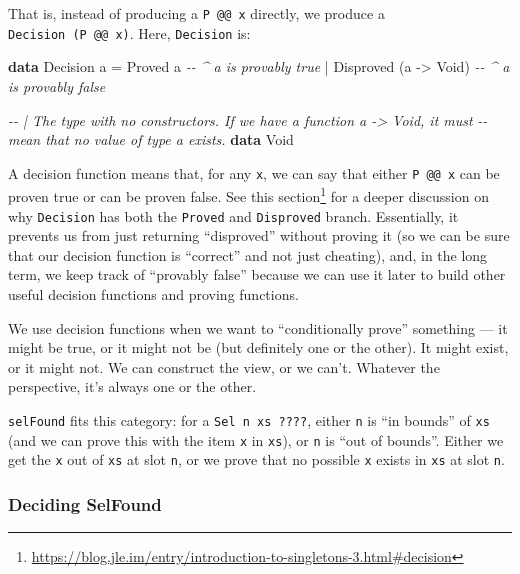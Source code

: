 \documentclass[]{article}
\newenvironment{Shaded}{}{}
\newcommand{\CommentTok}[1]{\textcolor[rgb]{0.38,0.63,0.69}{\textit{#1}}}
\newcommand{\DataTypeTok}[1]{\textcolor[rgb]{0.56,0.13,0.00}{#1}}
\newcommand{\KeywordTok}[1]{\textcolor[rgb]{0.00,0.44,0.13}{\textbf{#1}}}
\newcommand{\NormalTok}[1]{#1}
\newcommand{\OperatorTok}[1]{\textcolor[rgb]{0.40,0.40,0.40}{#1}}
\newcommand{\OtherTok}[1]{\textcolor[rgb]{0.00,0.44,0.13}{#1}}
\renewcommand{\href}[2]{#2\footnote{\url{#1}}}
\begin{document}
That is, instead of producing a \texttt{P\ @@\ x} directly, we produce a
\texttt{Decision\ (P\ @@\ x)}. Here, \texttt{Decision} is:

\begin{Shaded}
\begin{Highlighting}[]
\KeywordTok{data} \DataTypeTok{Decision}\NormalTok{ a}
    \OtherTok{=} \DataTypeTok{Proved}\NormalTok{     a                }\CommentTok{{-}{-} \^{} \textasciigrave{}a\textasciigrave{} is provably true}
    \OperatorTok{|} \DataTypeTok{Disproved}\NormalTok{ (a }\OtherTok{{-}\textgreater{}} \DataTypeTok{Void}\NormalTok{)       }\CommentTok{{-}{-} \^{} \textasciigrave{}a\textasciigrave{} is provably false}

\CommentTok{{-}{-} | The type with no constructors.  If we have a function \textasciigrave{}a {-}\textgreater{} Void\textasciigrave{}, it must}
\CommentTok{{-}{-} mean that no value of type \textasciigrave{}a\textasciigrave{} exists.}
\KeywordTok{data} \DataTypeTok{Void}
\end{Highlighting}
\end{Shaded}

A decision function means that, for any \texttt{x}, we can say that either
\texttt{P\ @@\ x} can be proven true or can be proven false. See
\href{https://blog.jle.im/entry/introduction-to-singletons-3.html\#decision}{this
section} for a deeper discussion on why \texttt{Decision} has both the
\texttt{Proved} and \texttt{Disproved} branch. Essentially, it prevents us from
just returning ``disproved'' without proving it (so we can be sure that our
decision function is ``correct'' and not just cheating), and, in the long term,
we keep track of ``provably false'' because we can use it later to build other
useful decision functions and proving functions.

We use decision functions when we want to ``conditionally prove'' something ---
it might be true, or it might not be (but definitely one or the other). It might
exist, or it might not. We can construct the view, or we can't. Whatever the
perspective, it's always one or the other.

\texttt{selFound} fits this category: for a \texttt{Sel\ n\ xs\ ????}, either
\texttt{n} is ``in bounds'' of \texttt{xs} (and we can prove this with the item
\texttt{x} in \texttt{xs}), or \texttt{n} is ``out of bounds''. Either we get
the \texttt{x} out of \texttt{xs} at slot \texttt{n}, or we prove that no
possible \texttt{x} exists in \texttt{xs} at slot \texttt{n}.

\subsubsection{Deciding SelFound}\label{deciding-selfound}
\end{document}
